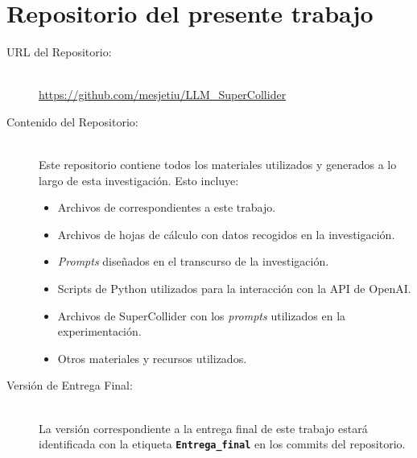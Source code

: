 \chapter{Repositorio del presente trabajo}
\label{anexo:repositorio}

\begin{center}
\end{center}

\begin{description}
    \item[URL del Repositorio:] \hfill \\
    \url{https://github.com/mesjetiu/LLM_SuperCollider}
    
    \item[Contenido del Repositorio:] \hfill \\
    Este repositorio contiene todos los materiales utilizados y generados a lo largo de esta investigación. Esto incluye:
    \begin{itemize}
        \item Archivos de  correspondientes a este trabajo.
        \item Archivos de hojas de cálculo con datos recogidos en la investigación.
        \item \textit{Prompts} diseñados en el transcurso de la investigación.
        \item Scripts de Python utilizados para la interacción con la API de OpenAI.
        \item Archivos de SuperCollider con los \textit{prompts} utilizados en la experimentación.
        \item Otros materiales y recursos utilizados.
    \end{itemize}
    
    \item[Versión de Entrega Final:] \hfill \\
    La versión correspondiente a la entrega final de este trabajo estará identificada con la etiqueta \textbf{\texttt{Entrega\_final}} en los commits del repositorio.

\end{description}



